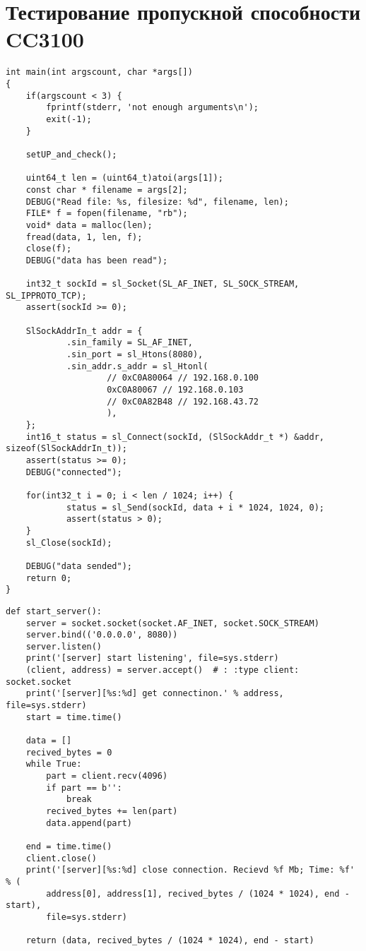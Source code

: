 \chapter{Тестирование пропускной способности CC3100}
\label{cha:impl}


\begin{verbatim}
int main(int argscount, char *args[])
{
    if(argscount < 3) {
        fprintf(stderr, 'not enough arguments\n');
        exit(-1);
    }

    setUP_and_check();

    uint64_t len = (uint64_t)atoi(args[1]);
    const char * filename = args[2];
    DEBUG("Read file: %s, filesize: %d", filename, len);
    FILE* f = fopen(filename, "rb");
    void* data = malloc(len);
    fread(data, 1, len, f);
    close(f);
    DEBUG("data has been read");

    int32_t sockId = sl_Socket(SL_AF_INET, SL_SOCK_STREAM, SL_IPPROTO_TCP);
    assert(sockId >= 0);

    SlSockAddrIn_t addr = {
            .sin_family = SL_AF_INET,
            .sin_port = sl_Htons(8080),
            .sin_addr.s_addr = sl_Htonl(
                    // 0xC0A80064 // 192.168.0.100
                    0xC0A80067 // 192.168.0.103
                    // 0xC0A82B48 // 192.168.43.72
                    ),
    };
    int16_t status = sl_Connect(sockId, (SlSockAddr_t *) &addr, sizeof(SlSockAddrIn_t));
    assert(status >= 0);
    DEBUG("connected");

    for(int32_t i = 0; i < len / 1024; i++) {
            status = sl_Send(sockId, data + i * 1024, 1024, 0);
            assert(status > 0);
    }
    sl_Close(sockId);

    DEBUG("data sended");
    return 0;
}
\end{verbatim}

\begin{verbatim}
def start_server():
    server = socket.socket(socket.AF_INET, socket.SOCK_STREAM)
    server.bind(('0.0.0.0', 8080))
    server.listen()
    print('[server] start listening', file=sys.stderr)
    (client, address) = server.accept()  # : :type client: socket.socket
    print('[server][%s:%d] get connectinon.' % address, file=sys.stderr)
    start = time.time()

    data = []
    recived_bytes = 0
    while True:
        part = client.recv(4096)
        if part == b'':
            break
        recived_bytes += len(part)
        data.append(part)

    end = time.time()
    client.close()
    print('[server][%s:%d] close connection. Recievd %f Mb; Time: %f' % (
        address[0], address[1], recived_bytes / (1024 * 1024), end - start),
        file=sys.stderr)

    return (data, recived_bytes / (1024 * 1024), end - start)
\end{verbatim}

